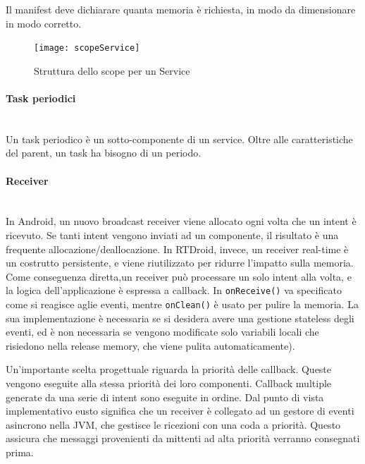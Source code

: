 Il manifest deve dichiarare quanta memoria è richiesta, in modo da dimensionare in modo corretto.
\begin{figure}[h]
	\centering
	\texttt{[image: scopeService]}
	\caption{Struttura dello scope per un Service}
	\label{fig:scopeservice}
\end{figure}

\paragraph{Task periodici}\mbox{} \\
Un task periodico è un sotto-componente di un service. Oltre alle caratteristiche del parent, un task ha bisogno di un periodo.

\paragraph{Receiver}\mbox{} \\
In Android, un nuovo broadcast receiver viene allocato ogni volta che un intent è ricevuto. Se tanti intent vengono inviati ad un componente, il risultato è una frequente allocazione/deallocazione. In RTDroid, invece, un receiver real-time è un costrutto persistente, e viene riutilizzato per ridurre l'impatto sulla memoria. Come conseguenza diretta,un receiver può processare un solo intent alla volta, e la logica dell'applicazione è espressa a callback. In \texttt{onReceive()} va specificato come si reagisce aglie eventi, mentre \texttt{onClean()} è usato per pulire la memoria. La sua implementazione è necessaria se si desidera avere una gestione stateless degli eventi, ed è non necessaria se vengono modificate solo variabili locali che risiedono nella release memory, che viene pulita automaticamente).

Un'importante scelta progettuale riguarda la priorità delle callback. Queste vengono eseguite alla stessa priorità dei loro componenti. Callback multiple generate da una serie di intent sono eseguite in ordine. Dal punto di vista implementativo eusto significa che un receiver è collegato ad un gestore di eventi asincrono nella JVM, che gestisce le ricezioni con una coda a priorità. Questo assicura che messaggi provenienti da mittenti ad alta priorità verranno consegnati prima. 

